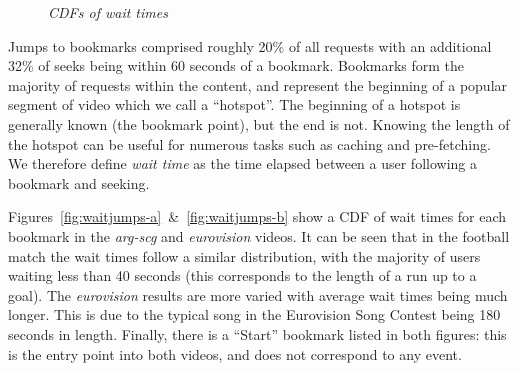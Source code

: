 \documentclass[a4paper,11pt]{article}
\newcommand{\capttext}{\protect\centering\em}
\begin{document}
\begin{figure}[tbp]
    \centering



    \caption{\capttext CDFs of wait times}
    \label{fig:waitjumps}
\end{figure}

Jumps to bookmarks comprised roughly 20\% of all requests with an additional 32\% of seeks being within 60 seconds of a bookmark. Bookmarks form the majority of requests within the content, and represent the beginning of a popular segment of video which we call a ``hotspot''. The beginning of a hotspot is generally known (the bookmark point), but the end is not. Knowing the length of the hotspot can be useful for numerous tasks such as caching and pre-fetching. We therefore define \emph{wait time} as the time elapsed between a user following a bookmark and seeking.

Figures~\ref{fig:waitjumps-a}~\&~\ref{fig:waitjumps-b} show a CDF of wait times for each bookmark in the \emph{arg-scg} and \emph{eurovision} videos. It can be seen that in the football match the wait times follow a similar distribution, with the majority of users waiting less than 40 seconds (this corresponds to the length of a run up to a goal). The \emph{eurovision} results are more varied with average wait times being much longer. This is due to the typical song in the Eurovision Song Contest being 180 seconds in length.  Finally, there is a ``Start'' bookmark listed in both figures: this is the entry point into both videos, and does not correspond to any event.
\end{document}
